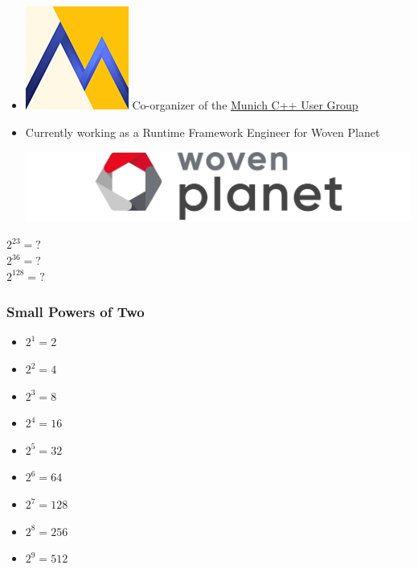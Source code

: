 \documentclass[aspectratio=43]{beamer}
\begin{document}
\begin{frame}[fragile]
\begin{itemize}
    \item \includegraphics[height=.05\textheight]{resources/mucpp-logo-128x128.png} Co-organizer of the \href{https://www.meetup.com/MUCplusplus/}{Munich C++ User Group}

    \item Currently working as a Runtime Framework Engineer for Woven Planet

    \vspace{10pt}
    \includegraphics[height=.1\textheight]{resources/woven_planet.jpg}

  \end{itemize}
\end{frame}


\begin{frame}[fragile]
  \begin{center}
    \pause
    \Huge $2^{23}=?$
    \vspace{20pt}
    \\ \pause
    \Huge $2^{36}=?$
    \vspace{20pt}
    \\ \pause
    \Huge $2^{128}=?$
  \end{center}
\end{frame}


\begin{frame}[fragile]

  \frametitle{Small Powers of Two}

  \begin{itemize}
    \item $2^1 = 2$
    \item $2^2 = 4$
    \item $2^3 = 8$
    \item $2^4 = 16$
    \item $2^5 = 32$
    \item $2^6 = 64$
    \item $2^7 = 128$
    \item $2^8 = 256$
    \item $2^9 = 512$
  \end{itemize}

\end{frame}
\end{document}
